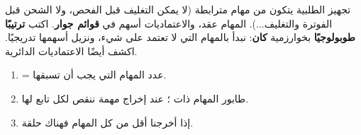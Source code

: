 \begin{statement}
تجهيز الطلبية يتكون من مهام مترابطة (لا يمكن التغليف قبل الفحص، ولا الشحن قبل الفوترة والتغليف...). المهام عقد، والاعتماديات أسهم في \textbf{قوائم جوار}. اكتب \textbf{ترتيبًا طوبولوجيًا} بخوارزمية \textbf{كان}: نبدأ بالمهام التي لا تعتمد على شيء، ونزيل أسهمها تدريجيًا. اكشف أيضًا الاعتماديات الدائرية.
\end{statement}
\begin{stepsbox}\begin{enumerate}
\item {} = عدد المهام التي يجب أن تسبقها.
\item طابور المهام ذات ؛ عند إخراج مهمة ننقص  لكل تابع لها.
\item إذا أخرجنا أقل من كل المهام فهناك حلقة.
\end{enumerate}\end{stepsbox}

